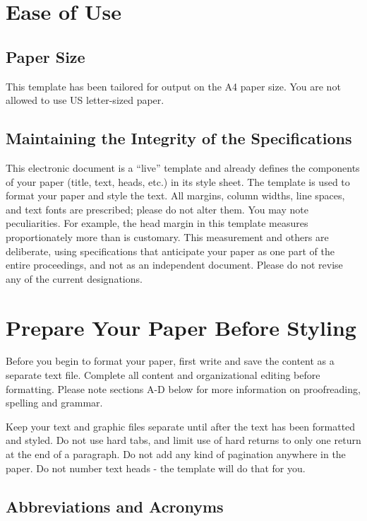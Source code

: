 \documentclass{MIPRO}
\begin{document}
\section{Ease of Use}

\subsection{Paper Size}

This template has been tailored for output on the A4 paper size. You are not allowed to use US letter-sized paper.

\subsection{Maintaining the Integrity of the Specifications}

This electronic document is a “live” template and already defines the components of your paper (title, text, heads, etc.) in its style sheet. The template is used to format your paper and style the text. All margins, column widths, line spaces, and text fonts are prescribed; please do not alter them. You may note peculiarities. For example, the head margin in this template measures proportionately more than is customary. This measurement and others are deliberate, using specifications that anticipate your paper as one part of the entire proceedings, and not as an independent document. Please do not revise any of the current designations.

\section{Prepare Your Paper Before Styling}

Before you begin to format your paper, first write and save the content as a separate text file. Complete all content and organizational editing before formatting. Please note sections A-D below for more information on proofreading, spelling and grammar.

Keep your text and graphic files separate until after the text has been formatted and styled. Do not use hard tabs, and limit use of hard returns to only one return at the end of a paragraph. Do not add any kind of pagination anywhere in the paper. Do not number text heads - the template will do that for you.

\subsection{Abbreviations and Acronyms}
\end{document}
